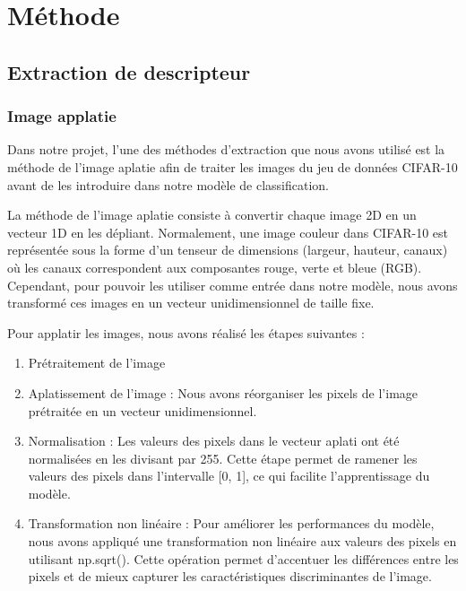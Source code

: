 \section{Méthode}

\subsection{Extraction de descripteur}

\subsubsection{Image applatie}

Dans notre projet, l'une des méthodes d'extraction que nous avons utilisé est la méthode de l'image aplatie afin de traiter les images du jeu de données CIFAR-10 avant de les introduire dans notre modèle de classification.

La méthode de l'image aplatie consiste à convertir chaque image 2D en un vecteur 1D en les dépliant. Normalement, une image couleur dans CIFAR-10 est représentée sous la forme d'un tenseur de dimensions (largeur, hauteur, canaux) où les canaux correspondent aux composantes rouge, verte et bleue (RGB). Cependant, pour pouvoir les utiliser comme entrée dans notre modèle, nous avons transformé ces images en un vecteur unidimensionnel de taille fixe.

Pour applatir les images, nous avons réalisé les étapes suivantes :

\begin{enumerate}
    \item Prétraitement de l'image
    
    \item Aplatissement de l'image : Nous avons réorganiser les pixels de l'image prétraitée en un vecteur unidimensionnel.

    \item Normalisation : Les valeurs des pixels dans le vecteur aplati ont été normalisées en les divisant par 255. Cette étape permet de ramener les valeurs des pixels dans l'intervalle [0, 1], ce qui facilite l'apprentissage du modèle.
    
    \item Transformation non linéaire : Pour améliorer les performances du modèle, nous avons appliqué une transformation non linéaire aux valeurs des pixels en utilisant np.sqrt(). Cette opération permet d'accentuer les différences entre les pixels et de mieux capturer les caractéristiques discriminantes de l'image.
\end{enumerate}


